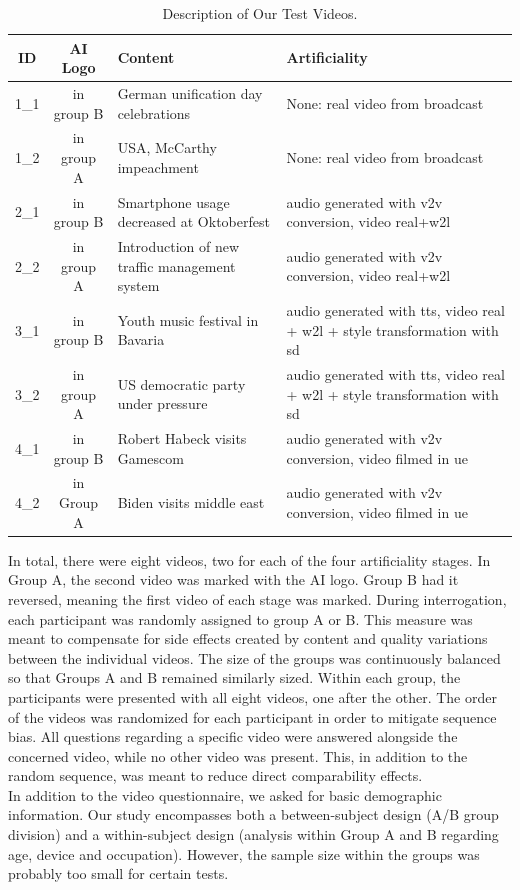 \documentclass[
  a4paper,  %
  twoside,  %
  bibliography=totoc,
  headsepline,
  cleardoublepage=empty,
  parskip=half,
  draft=false
]{scrbook}
\begin{document}
\begin{table}[h]
  \centering
  \begin{tabularx}{\linewidth}{c|c|X|X}
    \textbf{ID} & \textbf{AI Logo} & \textbf{Content} & \textbf{Artificiality}\\
    \midrule
    1\_1 & in group B & German unification day celebrations  & None: real video from broadcast \\
    \midrule
    1\_2 & in group A & USA, McCarthy impeachment  & None: real video from broadcast \\
    \midrule
    2\_1 & in group B & Smartphone usage decreased at Oktoberfest  & audio generated with \gls{v2v} conversion, video real+\gls{w2l} \\
    \midrule
    2\_2 & in group A & Introduction of new traffic management system  & audio generated with \gls{v2v} conversion, video real+\gls{w2l} \\
    \midrule
    3\_1 & in group B & Youth music festival in Bavaria  & audio generated with \gls{tts}, video real + \gls{w2l} + style transformation with \gls{sd} \\
    \midrule
    3\_2 & in group A & US democratic party under pressure  & audio generated with \gls{tts}, video real + \gls{w2l} + style transformation with \gls{sd} \\
    \midrule
    4\_1 & in group B & Robert Habeck visits Gamescom  & audio generated with \gls{v2v} conversion, video filmed in \gls{ue} \\
    \midrule
    4\_2 & in Group A & Biden visits middle east  & audio generated with \gls{v2v} conversion, video filmed in \gls{ue} \\
  \end{tabularx}
  \caption{Description of Our Test Videos.}
  \label{tab:video-table}
\end{table}

In total, there were eight videos, two for each of the four artificiality stages. In Group A, the second video was marked with the AI logo. Group B had it reversed, meaning the first video of each stage was marked. During interrogation, each participant was randomly assigned to group A or B. This measure was meant to compensate for side effects created by content and quality variations between the individual videos. The size of the groups was continuously balanced so that Groups A and B remained similarly sized. Within each group, the participants were presented with all eight videos, one after the other. The order of the videos was randomized for each participant in order to mitigate sequence bias. All questions regarding a specific video were answered alongside the concerned video, while no other video was present. This, in addition to the random sequence, was meant to reduce direct comparability effects. \\
In addition to the video questionnaire, we asked for basic demographic information. Our study encompasses both a between-subject design (A/B group division) and a within-subject design (analysis within Group A and B regarding age, device and occupation). However, the sample size within the groups was probably too small for certain tests.
\end{document}
